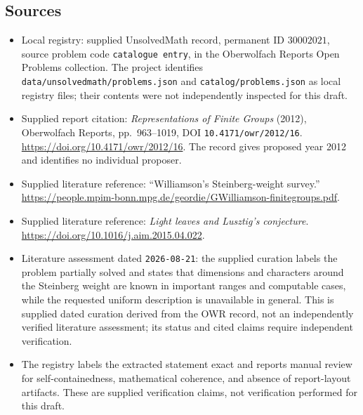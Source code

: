 \documentclass[11pt]{article}
\begin{document}
\subsection{Sources}
\begin{itemize}
\item Local registry: supplied UnsolvedMath record, permanent ID \(30002021\), source problem code \texttt{catalogue entry}, in the Oberwolfach Reports Open Problems collection. The project identifies \texttt{data/unsolvedmath/problems.json} and \texttt{catalog/problems.json} as local registry files; their contents were not independently inspected for this draft.
\item Supplied report citation: \emph{Representations of Finite Groups} (2012), Oberwolfach Reports, pp.~963--1019, DOI \texttt{10.4171/owr/2012/16}. \url{https://doi.org/10.4171/owr/2012/16}. The record gives proposed year 2012 and identifies no individual proposer.
\item Supplied literature reference: ``Williamson's Steinberg-weight survey.'' \url{https://people.mpim-bonn.mpg.de/geordie/GWilliamson-finitegroups.pdf}.
\item Supplied literature reference: \emph{Light leaves and Lusztig's conjecture}. \url{https://doi.org/10.1016/j.aim.2015.04.022}.
\item Literature assessment dated \texttt{2026-08-21}: the supplied curation labels the problem partially solved and states that dimensions and characters around the Steinberg weight are known in important ranges and computable cases, while the requested uniform description is unavailable in general. This is supplied dated curation derived from the OWR record, not an independently verified literature assessment; its status and cited claims require independent verification.
\item The registry labels the extracted statement exact and reports manual review for self-containedness, mathematical coherence, and absence of report-layout artifacts. These are supplied verification claims, not verification performed for this draft.
\end{itemize}
\end{document}
